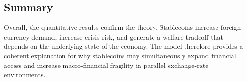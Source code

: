\subsection{Summary}

Overall, the quantitative results confirm the theory. Stablecoins increase foreign-currency demand, increase crisis risk, and generate a welfare tradeoff that depends on the underlying state of the economy. The model therefore provides a coherent explanation for why stablecoins may simultaneously expand financial access and increase macro-financial fragility in parallel exchange-rate environments.
